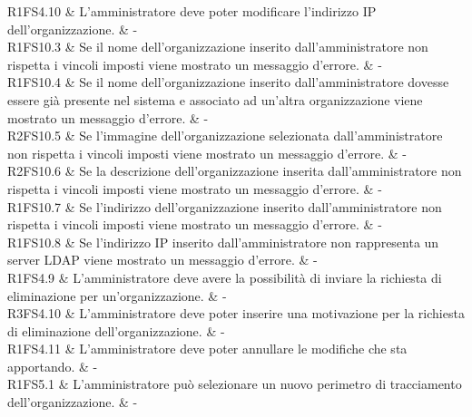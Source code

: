 R1FS4.10 & L'amministratore deve poter modificare l'indirizzo IP dell'organizzazione.  & - \\

R1FS10.3 & Se il nome dell'organizzazione inserito dall'amministratore non rispetta i vincoli imposti viene mostrato un messaggio d'errore.  & - \\

R1FS10.4 & Se il nome dell'organizzazione inserito dall'amministratore dovesse essere già presente nel sistema e associato ad un'altra organizzazione viene mostrato un messaggio d'errore.  & - \\

R2FS10.5 & Se l'immagine dell'organizzazione selezionata dall'amministratore non rispetta i vincoli imposti viene mostrato un messaggio d'errore. & - \\

R2FS10.6 & Se la descrizione dell'organizzazione inserita dall'amministratore non rispetta i vincoli imposti viene mostrato un messaggio d'errore. & - \\

R1FS10.7 & Se l'indirizzo dell'organizzazione inserito dall'amministratore non rispetta i vincoli imposti viene mostrato un messaggio d'errore.  & - \\

R1FS10.8 & Se l'indirizzo IP inserito dall'amministratore non rappresenta un server LDAP viene mostrato un messaggio d'errore.  & - \\

R1FS4.9 & L'amministratore deve avere la possibilità di inviare la richiesta di eliminazione per un'organizzazione.  & - \\

R3FS4.10 & L'amministratore deve poter inserire una motivazione per la richiesta di eliminazione dell'organizzazione.  & - \\

R1FS4.11 & L'amministratore deve poter annullare le modifiche che sta apportando.  & - \\




R1FS5.1 & L'amministratore può selezionare un nuovo perimetro di tracciamento dell'organizzazione. & - \\

